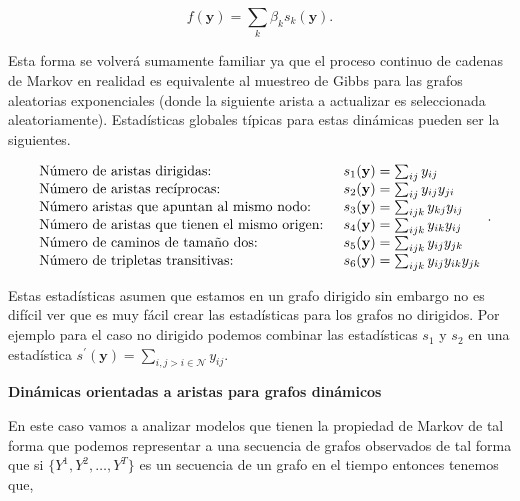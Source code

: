$$f ( \mathbf { y } ) = \sum _ { k } \beta _ { k } s _ { k } ( \mathbf { y } ).$$

Esta forma se volverá sumamente familiar ya que el proceso continuo de cadenas de Markov en realidad es equivalente al muestreo de Gibbs para las grafos aleatorias exponenciales (donde la siguiente arista a actualizar es seleccionada aleatoriamente). Estadísticas globales típicas para estas dinámicas pueden ser la siguientes.

\begin{equation}
    \begin{align}
        \begin{array} { l l } { \text { Número de aristas dirigidas: } } & { s _ { 1 } ( \mathbf { y } ) = \sum _ { i j } y _ { i j } } \\ { \text { Número de aristas recíprocas: } } & { s _ { 2 } ( \mathbf { y } ) = \sum _ { i j } y _ { i j } y _ { j i } } \\ { \text { Número aristas que apuntan al mismo nodo: } } & { s _ { 3 } ( \mathbf { y } ) = \sum _ { i j k } y _ { k j } y _ { i j } } \\ { \text { Número de aristas que tienen el mismo origen: } } &  { s _ { 4 } ( \mathbf { y } ) = \sum _ { i j k } y _ { i k } y _ { i j } } \\ { \text { Número de caminos de tamaño dos: } } & { s _ { 5 } ( \mathbf { y } ) = \sum _ { i j k }  y _ { i j } y _ { j k } } \\ { \text { Número de tripletas transitivas: } } & { s _ { 6 } ( \mathbf { y } ) = \sum _ { i j k }  y _ { i j } y _ { i k } y _ { j k } } \end{array}.
    \end{align}
\end{equation}



Estas estadísticas asumen que estamos en un grafo dirigido sin embargo no es difícil ver que es muy fácil crear las estadísticas para los grafos no dirigidos. Por ejemplo para el caso no dirigido podemos combinar las estadísticas $s_1$ y $s_2$ en una estadística ${ s ^ { ' } ( \mathbf { y } ) = \sum _ { i , j > i \in \mathcal{N} } y _ { i j } }$.

\textbf{Dinámicas orientadas a aristas para grafos dinámicos}

En este caso vamos a analizar modelos que tienen la propiedad de Markov de tal forma que podemos representar a una secuencia de grafos observados de tal forma que si $\{Y^1,Y^2,\dots,Y^T\}$ es un secuencia de un grafo en el tiempo entonces tenemos que,

